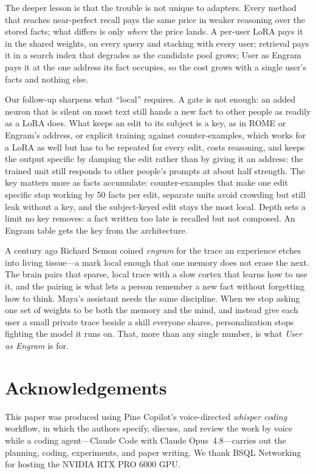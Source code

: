 \documentclass[11pt]{article}
\begin{document}
The deeper lesson is that the trouble is not unique to adapters.
Every method that reaches near-perfect recall pays the same price
in weaker reasoning over the stored facts; what differs is only
\emph{where} the price lands. A per-user LoRA pays it in the shared
weights, on every query and stacking with every user; retrieval
pays it in a search index that degrades as the candidate pool
grows; User as Engram pays it at the one address its fact occupies,
so the cost grows with a single user's facts and nothing else.

Our follow-up sharpens what ``local'' requires. A gate is not enough:
an added neuron that is silent on most text still hands a new fact to
other people as readily as a LoRA does. What keeps an edit to its
subject is a key, as in ROME or Engram's address, or explicit training
against counter-examples, which works for a LoRA as well but has to be
repeated for every edit, costs reasoning, and keeps the output specific
by damping the edit rather than by giving it an address: the trained
unit still responds to other people's prompts at about half strength.
The key matters more as facts accumulate: counter-examples that make
one edit specific stop working by 50 facts per edit, separate units
avoid crowding but still leak without a key, and the subject-keyed edit
stays the most local. Depth sets a limit no key removes: a fact written
too late is recalled but not composed. An Engram table gets the
key from the architecture.

A century ago Richard Semon coined \emph{engram} for the trace
an experience etches into living tissue---a mark local enough
that one memory does not erase the next. The brain pairs that
sparse, local trace with a slow cortex that learns how to use
it, and the pairing is what lets a person remember a new fact
without forgetting how to think. Maya's assistant needs the same
discipline. When we stop asking one set of weights to be both
the memory and the mind, and instead give each user a small
private trace beside a skill everyone shares, personalization
stops fighting the model it runs on. That, more than any single
number, is what \emph{User as Engram} is for.

\section*{Acknowledgements}

This paper was produced using Pine Copilot's voice-directed \emph{whisper coding} workflow, in which the authors specify, discuss, and review the work by voice while a coding agent---Claude Code with Claude Opus~4.8---carries out the planning, coding, experiments, and paper writing.
We thank BSQL Networking for hosting the NVIDIA RTX PRO 6000 GPU.
\end{document}
